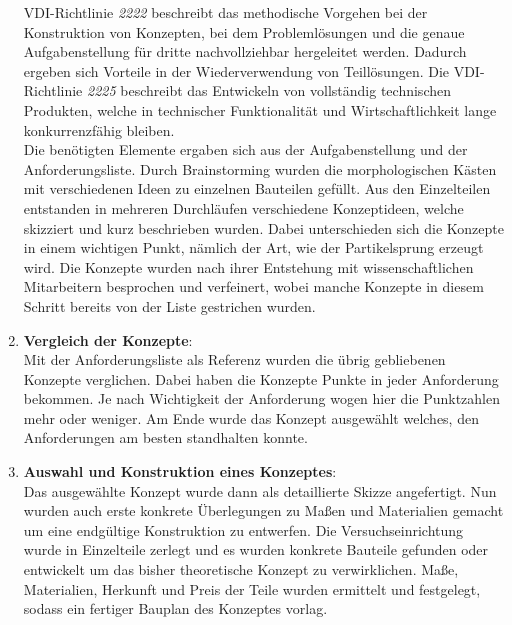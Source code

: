 \begin{enumerate}
VDI-Richtlinie \textit{2222} beschreibt das methodische Vorgehen bei der Konstruktion von Konzepten, bei dem Probleml\"{o}sungen und die genaue Aufgabenstellung f\"{u}r dritte nachvollziehbar hergeleitet werden. Dadurch ergeben sich Vorteile in der Wiederverwendung von Teill\"{o}sungen. Die VDI-Richtlinie \textit{2225} beschreibt das Entwickeln von vollst\"{a}ndig technischen Produkten, welche in technischer Funktionalit\"{a}t und Wirtschaftlichkeit lange konkurrenzf\"{a}hig bleiben.\\
Die ben\"{o}tigten Elemente ergaben sich aus der Aufgabenstellung und der Anforderungsliste. Durch Brainstorming wurden die morphologischen K\"{a}sten mit verschiedenen Ideen zu einzelnen Bauteilen gef\"{u}llt. Aus den Einzelteilen entstanden in mehreren Durchl\"{a}ufen verschiedene Konzeptideen, welche skizziert und kurz beschrieben wurden. Dabei unterschieden sich die Konzepte in einem wichtigen Punkt, n\"{a}mlich der Art, wie der Partikelsprung erzeugt wird. Die Konzepte wurden nach ihrer Entstehung mit wissenschaftlichen Mitarbeitern besprochen und verfeinert, wobei manche Konzepte in diesem Schritt bereits von der Liste gestrichen wurden.
\item \textbf{Vergleich der Konzepte}:\\
Mit der Anforderungsliste als Referenz wurden die \"{u}brig gebliebenen Konzepte verglichen. Dabei haben die Konzepte Punkte in jeder Anforderung bekommen. Je nach Wichtigkeit der Anforderung wogen hier die Punktzahlen mehr oder weniger. Am Ende wurde das Konzept ausgew\"{a}hlt welches, den Anforderungen am besten standhalten konnte.
\item \textbf{Auswahl und Konstruktion eines Konzeptes}:\\
Das ausgew\"{a}hlte Konzept wurde dann als detaillierte Skizze angefertigt. Nun wurden auch erste konkrete \"{U}berlegungen zu Ma{\ss}en und Materialien gemacht um eine endg\"{u}ltige Konstruktion zu entwerfen. Die Versuchseinrichtung wurde in Einzelteile zerlegt und es wurden konkrete Bauteile gefunden oder entwickelt um das bisher theoretische Konzept zu verwirklichen. Ma{\ss}e, Materialien, Herkunft und Preis der Teile wurden ermittelt und festgelegt, sodass ein fertiger Bauplan des Konzeptes vorlag.
\end{enumerate}